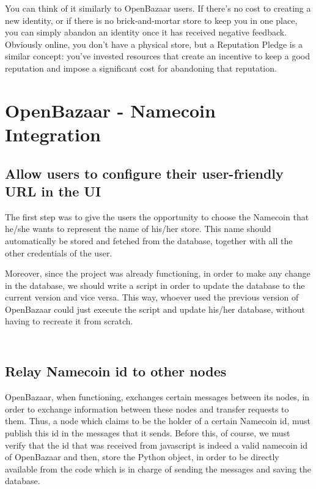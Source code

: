 \documentclass[journal]{IEEEtran}
\newcommand{\code}[2]{
    \inputminted[fontsize=\scriptsize, frame=single, linenos=false]{#1}{#2}
}
\begin{document}
You can think of it similarly to OpenBazaar users. If there’s no cost to creating a new identity, or if there is no brick-and-mortar store to keep you in one place, you can simply abandon an identity once it has received negative feedback. Obviously online, you don’t have a physical store, but a Reputation Pledge is a similar concept: you’ve invested resources that create an incentive to keep a good reputation and impose a significant cost for abandoning that reputation.


\section{OpenBazaar - Namecoin Integration}


\subsection{Allow users to configure their user-friendly URL in the UI}

The first step was to give the users the opportunity to choose the Namecoin that he/she wants to represent the name of his/her store. This name should automatically be stored and fetched from the database, together with all the other credentials of the user. 

Moreover, since the project was already functioning, in order to make any change in the database, we should write a script in order to update the database to the current version and vice versa. This way, whoever used the previous version of OpenBazaar could just execute the script and update his/her database, without having to recreate it from scratch. 

\code{html}{codes/settings.html}
\code{python}{codes/migration4.py}

\subsection{Relay Namecoin id to other nodes}

OpenBazaar, when functioning, exchanges certain messages between its nodes, in order to exchange information between these nodes and transfer requests to them. Thus, a node which claims to be the holder of a certain Namecoin id, must publish this id in the messages that it sends. Before this, of course, we must verify that the id that was received from javascript is indeed a valid namecoin id of OpenBazaar and then, store the Python object, in order to be directly available from the code which is in charge of sending the messages and saving the database. 
\end{document}
